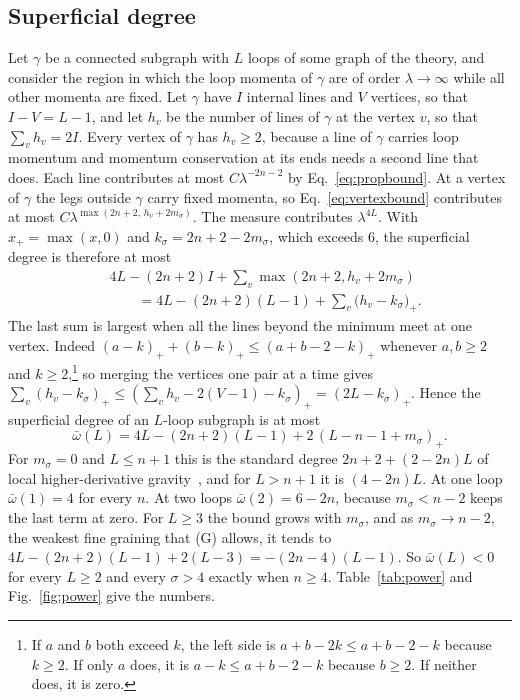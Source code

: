 \documentclass[aps,prd,10pt,twocolumn,superscriptaddress,nofootinbib,floatfix,longbibliography]{revtex4-2}
\begin{document}
\subsection{Superficial degree}
\label{sec:degree}

Let $\gamma$ be a connected subgraph with $L$ loops of some graph of the theory, and consider the region in which the loop momenta of $\gamma$ are of order $\lambda\to\infty$ while all other momenta are fixed. Let $\gamma$ have $I$ internal lines and $V$ vertices, so that $I-V=L-1$, and let $h_v$ be the number of lines of $\gamma$ at the vertex $v$, so that $\sum_vh_v=2I$. Every vertex of $\gamma$ has $h_v\ge2$, because a line of $\gamma$ carries loop momentum and momentum conservation at its ends needs a second line that does. Each line contributes at most $C\lambda^{-2n-2}$ by Eq.~\eqref{eq:propbound}. At a vertex of $\gamma$ the legs outside $\gamma$ carry fixed momenta, so Eq.~\eqref{eq:vertexbound} contributes at most $C\lambda^{\max(2n+2,\,h_v+2m_\sigma)}$. The measure contributes $\lambda^{4L}$. With $x_+=\max(x,0)$ and $k_\sigma=2n+2-2m_\sigma$, which exceeds $6$, the superficial degree is therefore at most
\[
\begin{aligned}
&4L-(2n+2)I+\sum_v\max(2n+2,h_v+2m_\sigma)\\
&\qquad=4L-(2n+2)(L-1)+\sum_v\bigl(h_v-k_\sigma\bigr)_+ .
\end{aligned}
\]
The last sum is largest when all the lines beyond the minimum meet at one vertex. Indeed $(a-k)_++(b-k)_+\le(a+b-2-k)_+$ whenever $a,b\ge2$ and $k\ge2$,\footnote{If $a$ and $b$ both exceed $k$, the left side is $a+b-2k\le a+b-2-k$ because $k\ge2$. If only $a$ does, it is $a-k\le a+b-2-k$ because $b\ge2$. If neither does, it is zero.} so merging the vertices one pair at a time gives $\sum_v(h_v-k_\sigma)_+\le(\sum_vh_v-2(V-1)-k_\sigma)_+=(2L-k_\sigma)_+$. Hence the superficial degree of an $L$-loop subgraph is at most
\begin{equation}
\label{eq:omega}
\bar\omega(L)=4L-(2n+2)(L-1)+2\,(L-n-1+m_\sigma)_+ .
\end{equation}
For $m_\sigma=0$ and $L\le n+1$ this is the standard degree $2n+2+(2-2n)L$ of local higher-derivative gravity~\cite{AsoreyLopezShapiro1997,Modesto2012}, and for $L>n+1$ it is $(4-2n)L$. At one loop $\bar\omega(1)=4$ for every $n$. At two loops $\bar\omega(2)=6-2n$, because $m_\sigma<n-2$ keeps the last term at zero. For $L\ge3$ the bound grows with $m_\sigma$, and as $m_\sigma\to n-2$, the weakest fine graining that (G) allows, it tends to $4L-(2n+2)(L-1)+2(L-3)=-(2n-4)(L-1)$. So $\bar\omega(L)<0$ for every $L\ge2$ and every $\sigma>4$ exactly when $n\ge4$. Table~\ref{tab:power} and Fig.~\ref{fig:power} give the numbers.
\end{document}
